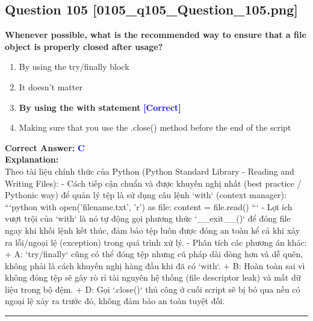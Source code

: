 \documentclass[11pt,a4paper]{article}
\begin{document}
\begin{minipage}{\textwidth}
\subsection*{Question 105 \quad \footnotesize{[0105_q105_Question_105.png]}}
\noindent \textbf{Whenever possible, what is the recommended way to ensure that a file object is properly closed after usage?}

\begin{enumerate}[label=\Alph*.]
    \item By using the try/finally block
    \item It doesn't matter
    \item \textbf{By using the with statement} \hfill \textcolor{blue}{\textbf{[Correct]}}
    \item Making sure that you use the .close() method before the end of the script
\end{enumerate}

\noindent \textbf{Correct Answer:} \textcolor{blue}{\textbf{C}} \\[4pt]
\noindent \textbf{Explanation:}\\
Theo tài liệu chính thức của Python (Python Standard Library - Reading and Writing Files):\newline
- Cách tiếp cận chuẩn và được khuyến nghị nhất (best practice / Pythonic way) để quản lý tệp là sử dụng câu lệnh `with` (context manager):\newline
  ```python\newline
  with open('filename.txt', 'r') as file:\newline
      content = file.read()\newline
  ```\newline
- Lợi ích vượt trội của `with` là nó tự động gọi phương thức `__exit__()` để đóng file ngay khi khối lệnh kết thúc, đảm bảo tệp luôn được đóng an toàn kể cả khi xảy ra lỗi/ngoại lệ (exception) trong quá trình xử lý.\newline
- Phân tích các phương án khác:\newline
  + A: `try/finally` cũng có thể đóng tệp nhưng cú pháp dài dòng hơn và dễ quên, không phải là cách khuyến nghị hàng đầu khi đã có `with`.\newline
  + B: Hoàn toàn sai vì không đóng tệp sẽ gây rò rỉ tài nguyên hệ thống (file descriptor leak) và mất dữ liệu trong bộ đệm.\newline
  + D: Gọi `.close()` thủ công ở cuối script sẽ bị bỏ qua nếu có ngoại lệ xảy ra trước đó, không đảm bảo an toàn tuyệt đối.
\end{minipage}
\vspace{0.8cm}
\hrule
\vspace{0.5cm}
\end{document}
